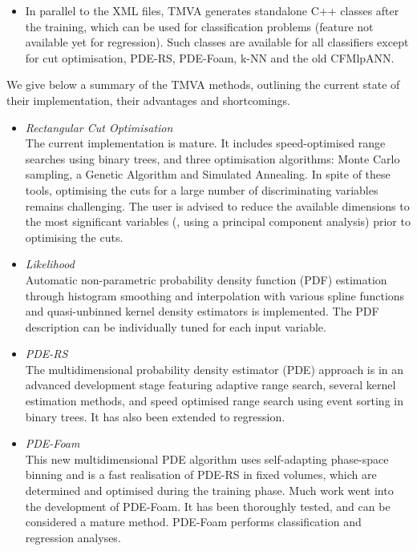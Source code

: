 \begin{itemize}
\item In parallel to the XML files, TMVA generates standalone C++ classes after the 
      training, which can be used for classification problems (feature not available 
      yet for regression). Such classes are available for all classifiers except for 
      cut optimisation, PDE-RS, PDE-Foam, k-NN and the old CFMlpANN.

\end{itemize}
We give below a summary of the TMVA methods, outlining the current state of their
implementation, their advantages and shortcomings.
\begin{itemize}

\item {\em Rectangular Cut Optimisation} \\
      The current implementation is mature. 
      It includes speed-optimised range searches using binary 
      trees, and three optimisation algorithms: Monte Carlo sampling,
      a Genetic Algorithm and Simulated Annealing. In spite of these 
      tools, optimising the cuts for a large number of discriminating variables 
      remains challenging. The user is advised to reduce the available 
      dimensions to the most significant variables (\eg, using a principal
      component analysis) prior to optimising the cuts.

\item {\em Likelihood} \\
      Automatic non-parametric probability density function (PDF) estimation through 
      histogram smoothing and interpolation with various spline functions and 
      quasi-unbinned kernel density estimators is implemented. The PDF description
      can be individually tuned for each input variable. 

\item {\em PDE-RS} \\
      The multidimensional probability density estimator (PDE) approach is in an advanced 
      development stage featuring adaptive range search, several kernel estimation 
      methods, and speed optimised range search using event sorting in binary trees.
      It has also been extended to regression.

\item {\em PDE-Foam} \\
      This new multidimensional PDE algorithm uses self-adapting phase-space 
      binning and is a fast realisation of PDE-RS in fixed volumes, which are
      determined and optimised during the training phase. Much work went 
      into the development of PDE-Foam. It has been thoroughly tested, and 
      can be considered a mature method. PDE-Foam performs classification 
      and regression analyses.


\end{itemize}
